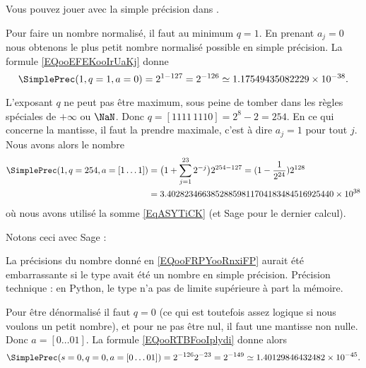 Vous pouvez jouer avec la simple précision dans \cite{ooOSFYooHCgMRL}.

\begin{example}
    Pour faire un nombre normalisé, il faut au minimum \( q=1\). En prenant \( a_j=0\) nous obtenons le plus petit nombre normalisé possible en simple précision. La formule \eqref{EQooEFEKooIrUaKj} donne
    \begin{equation}
        \SimplePrec(1,q=1,a=0)=2^{1-127}=2^{-126}\simeq 1.17549435082229\times 10^{-38}.
    \end{equation}
\end{example}

\begin{example}
    L'exposant \( q\) ne peut pas être maximum, sous peine de tomber dans les règles spéciales de \( +\infty\) ou \( \NaN\). Donc \( q=[1111\,1110]=2^{8}-2=254\). En ce qui concerne la mantisse, il faut la prendre maximale, c'est à dire \( a_j=1\) pour tout \( j\). Nous avons alors le nombre
        \begin{subequations}
            \begin{align}
                \SimplePrec(1,q=254,a=[1\ldots 1])&=\big( 1+\sum_{j=1}^{23}2^{-j} \big)2^{254-127}=(1-\frac{1}{ 2^{24} })2^{128}\\
                &=3.40282346638528859811704183484516925440\times 10^{38}  \label{EQooFRPYooRnxiFP}
            \end{align}
        \end{subequations}
    où nous avons utilisé la somme \eqref{EqASYTiCK} (et Sage pour le dernier calcul).
\end{example}

Notons ceci avec Sage :


La précisions du nombre donné en \eqref{EQooFRPYooRnxiFP} aurait été embarrassante si le type avait été un nombre en simple précision. Précision technique : en Python, le type  n'a pas de limite supérieure à part la mémoire.

\begin{example}
    Pour être dénormalisé il faut \( q=0\) (ce qui est toutefois assez logique si nous voulons un petit nombre), et pour ne pas être nul, il faut une mantisse non nulle. Donc \( a=[0\ldots 01]\). La formule \eqref{EQooRTBFooIplydi} donne alors
    \begin{equation}
        \SimplePrec(s=0,q=0,a=[0\ldots 01])=2^{-126}2^{-23}=2^{-149}\simeq 1.40129846432482\times 10^{-45}.
    \end{equation}
\end{example}

